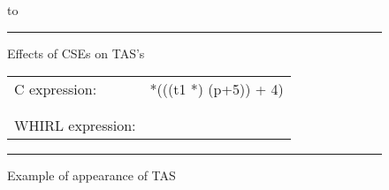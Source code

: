 \begin{figure}
\hbox to 
\hrule
\caption{Effects of CSEs on TAS's}
\label{effect-of-cse-on-tas}
\end{figure}

\begin{figure}
\begin{tabular}{ll}
C expression: & *(((t1 *) (p+5)) + 4) \\
&\\
&\\
WHIRL expression: & 
\vbox{\begin{minipage}{2in}
\begin{verbatim}
        U4U4LDID p
        I4INTCONST 20
      U4ADD
    U4TAS t1
    I4INTCONST 16 
  U4ADD
I4I4LOAD 0

\end{verbatim}
\end{minipage}}\\
\end{tabular}
\hrule
\caption{Example of appearance of TAS}
\label{example-appear-tas}
\end{figure}



